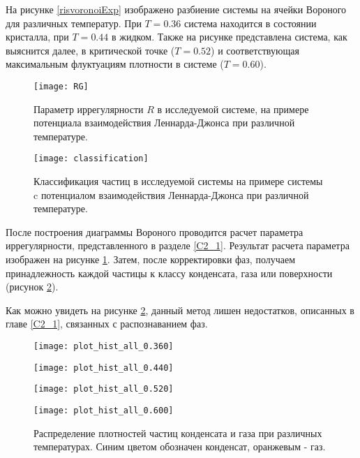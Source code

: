 На рисунке \ref{risvoronoiExp} изображено разбиение системы на ячейки Вороного для различных температур. При $T = 0.36$ система находится в состоянии кристалла, при $T = 0.44$ в жидком. Также на рисунке представлена система, как выяснится далее, в критической точке ($T = 0.52$) и соответствующая максимальным флуктуациям плотности в системе ($T = 0.60$).

\begin{figure}[h]
\begin{center}
\texttt{[image: RG]}
\caption{Параметр иррегулярности $R$ в исследуемой системе, на примере потенциала взаимодействия Леннарда-Джонса при различной температуре.}
\label{risIregExp}
\end{center}
\end{figure}

\begin{figure}[h]
\begin{center}
\texttt{[image: classification]}
\caption{Классификация частиц в исследуемой системы на примере системы c потенциалом взаимодействия Леннарда-Джонса при различной температуре.}
\label{risClassExp}
\end{center}
\end{figure}

После построения диаграммы Вороного проводится расчет параметра иррегулярности, представленного в разделе \ref{C2_1}. Результат расчета параметра изображен на рисунке \ref{risIregExp}. Затем, после корректировки фаз, получаем принадлежность каждой частицы к классу конденсата, газа или поверхности (рисунок \ref{risClassExp}).

Как можно увидеть на рисунке \ref{risClassExp}, данный метод лишен недостатков, описанных в главе \ref{C2_1}, связанных с распознаванием фаз.

\begin{figure}[h]
\begin{center}

\begin{minipage}[h]{0.45\linewidth}
\texttt{[image: plot\_hist\_all\_0.360]}
\end{minipage}
\begin{minipage}[h]{0.45\linewidth}
\texttt{[image: plot\_hist\_all\_0.440]}
\end{minipage}

\begin{minipage}[h]{0.45\linewidth}
\texttt{[image: plot\_hist\_all\_0.520]}
\end{minipage}
\begin{minipage}[h]{0.45\linewidth}
\texttt{[image: plot\_hist\_all\_0.600]}
\end{minipage}
\caption{Распределение плотностей частиц конденсата и газа при различных температурах. Синим цветом обозначен конденсат, оранжевым  - газ.}
\label{risRhoM}
\end{center}
\end{figure}

